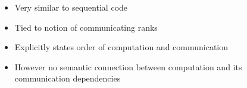 {\begin{frame}[fragile]
  \begin{columns}
    \begin{column}{0.4\textwidth}
      
    \end{column}
    \begin{column}{0.6\textwidth}
      \begin{itemize}
      \item Very similar to sequential code
      \item Tied to notion of communicating ranks
      \item Explicitly states order of computation and communication
      \item However no semantic connection between computation and its communication dependencies
      \end{itemize}
    \end{column}
  \end{columns}

\end{frame}
}

